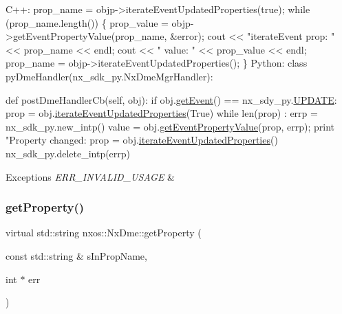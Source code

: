 \begin{DoxyCode}
C++:
   prop\_name = objp->iterateEventUpdatedProperties(\textcolor{keyword}{true});
   \textcolor{keywordflow}{while} (prop\_name.length()) \{
      prop\_value = objp->getEventPropertyValue(prop\_name, &error);
      cout << \textcolor{stringliteral}{"iterateEvent prop: "} << prop\_name << endl;
      cout << \textcolor{stringliteral}{"             value: "} << prop\_value << endl;
      prop\_name = objp->iterateEventUpdatedProperties();
   \}
Python:
   \textcolor{keyword}{class }pyDmeHandler(nx\_sdk\_py.NxDmeMgrHandler):

      def postDmeHandlerCb(self, obj):
         if obj.\mbox{\hyperlink{classnxos_1_1_nx_dme_aff302a3891e0b6f69e9e0fd26e6e16a7}{getEvent}}() == nx\_sdy\_py.\mbox{\hyperlink{nx__common_8h_af9a9040b7681199d386e94eb888018cba4f3a5ababd9a5356d642a492f5ccc371}{UPDATE}}:
             prop = obj.\mbox{\hyperlink{classnxos_1_1_nx_dme_a2fe8b05c2c14f16ad7a2f4002a63baf2}{iterateEventUpdatedProperties}}(True)
             while len(prop) :
                errp = nx\_sdk\_py.new\_intp()
                value = obj.\mbox{\hyperlink{classnxos_1_1_nx_dme_a883efffe8438738ac723e4a8e913e0ca}{getEventPropertyValue}}(prop, errp);
                print "Property changed: %
                prop = obj.\mbox{\hyperlink{classnxos_1_1_nx_dme_a2fe8b05c2c14f16ad7a2f4002a63baf2}{iterateEventUpdatedProperties}}()
                nx\_sdk\_py.delete\_intp(errp)
\end{DoxyCode}



\begin{DoxyExceptions}{Exceptions}
{\em E\+R\+R\+\_\+\+I\+N\+V\+A\+L\+I\+D\+\_\+\+U\+S\+A\+GE} & \\
\hline
\end{DoxyExceptions}
\mbox{\label{classnxos_1_1_nx_dme_af4a2a0bb41b6be55593e8624700a2d6d}} 
\subsubsection{\texorpdfstring{get\+Property()}{getProperty()}}
{\footnotesize\ttfamily virtual std\+::string nxos\+::\+Nx\+Dme\+::get\+Property (\begin{DoxyParamCaption}\item[{const std\+::string \&}]{s\+In\+Prop\+Name,  }\item[{int $\ast$}]{err }\end{DoxyParamCaption})\hspace{0.3cm}{\ttfamily [pure virtual]}}

